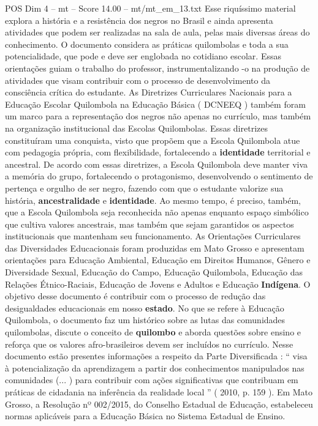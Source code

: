 \begin{textsample}{POS Dim 4 – mt – Score 14.00 – mt/mt\_em\_13.txt}
Esse riquíssimo material explora a história e a resistência dos negros no Brasil e ainda apresenta atividades que podem ser realizadas na sala de aula, pelas mais diversas áreas do conhecimento.
O documento considera as práticas quilombolas e toda a sua potencialidade, que pode e deve ser englobada no cotidiano escolar.
Essas orientações guiam o trabalho do professor, instrumentalizando -o na produção de atividades que visam contribuir com o processo de desenvolvimento da consciência crítica do estudante.
As Diretrizes Curriculares Nacionais para a Educação Escolar Quilombola na Educação Básica ( DCNEEQ ) também foram um marco para a representação dos negros não apenas no currículo, mas também na organização institucional das Escolas Quilombolas.
Essas diretrizes constituíram uma conquista, visto que propõem que a Escola Quilombola atue com pedagogia própria, com flexibilidade, fortalecendo a \textbf{identidade} territorial e ancestral.
De acordo com essas diretrizes, a Escola Quilombola deve manter viva a memória do grupo, fortalecendo o protagonismo, desenvolvendo o sentimento de pertença e orgulho de ser negro, fazendo com que o estudante valorize sua história, \textbf{ancestralidade} e \textbf{identidade}.
Ao mesmo tempo, é preciso, também, que a Escola Quilombola seja reconhecida não apenas enquanto espaço simbólico que cultiva valores ancestrais, mas também que sejam garantidos os aspectos institucionais que mantenham seu funcionamento.
As Orientações Curriculares das Diversidades Educacionais foram produzidas em Mato Grosso e apresentam orientações para Educação Ambiental, Educação em Direitos Humanos, Gênero e Diversidade Sexual, Educação do Campo, Educação Quilombola, Educação das Relações Étnico-Raciais, Educação de Jovens e Adultos e Educação \textbf{Indígena}.
O objetivo desse documento é contribuir com o processo de redução das desigualdades educacionais em nosso \textbf{estado}.
No que se refere à Educação Quilombola, o documento faz um histórico sobre as lutas das comunidades quilombolas, discute o conceito de \textbf{quilombo} e aborda questões sobre ensino e reforça que os valores afro-brasileiros devem ser incluídos no currículo.
Nesse documento estão presentes informações a respeito da Parte Diversificada : “ visa à potencialização da aprendizagem a partir dos conhecimentos manipulados nas comunidades (... ) para contribuir com ações significativas que contribuam em práticas de cidadania na inferência da realidade local ” ( 2010, p. 159 ).
Em Mato Grosso, a Resolução nº 002/2015, do Conselho Estadual de Educação, estabeleceu normas aplicáveis para a Educação Básica no Sistema Estadual de Ensino.

\end{textsample}
